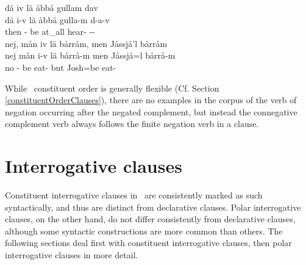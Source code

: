  
\z
\ea\label{negation5}%
\glll	dä iv lä åbbå gullam dav\\
	dä i-v lä åbbå gulla-m d-a-v\\
	then - be\BS{} at\_all hear- --\\\nopagebreak
{} 
\z
\ea\label{negation6}%
\glll	nej, mån iv lä bårråm, men Jåssjå'l bårråm\\
	nej mån i-v lä bårrå-m men Jåssjå=l bårrå-m\\
	no  - be\BS{} eat- but Josh\BS{}=be\BS{} eat-\\\nopagebreak
{} 
\z

While \PS\ constituent order is generally flexible (Cf. Section \ref{constituentOrderClauses}), there are no examples in the corpus of the verb of negation occurring after the negated complement, but instead the connegative complement verb always follows the finite negation verb in a clause. 

\section{Interrogative clauses}\label{interrogClauses}
Constituent interrogative clauses in \PS\ are consistently marked as such syntactically, and thus are distinct from declarative clauses. Polar interrogative clauses, on the other hand, do not differ consistently from declarative clauses, although some syntactic constructions are more common than others. The following sections deal first with constituent interrogative clauses, then polar interrogative clauses in more detail.

